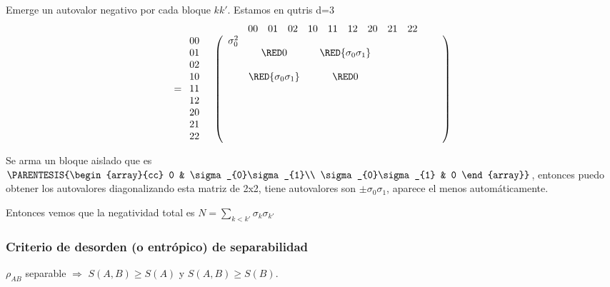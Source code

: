 Emerge un autovalor negativo por cada bloque $kk'$. Estamos en qutris
d=3
\[
\begin{array}{cc}
 & \begin{array}{ccccccccc}
00 & 01 & 02 & 10 & 11 & 12 & 20 & 21 & 22\end{array}\\
=\begin{array}{c}
00\\
01\\
02\\
10\\
11\\
12\\
20\\
21\\
22
\end{array} & \left(\begin{array}{ccccccccc}
\sigma_{0}^{2} &  &  &  & \text{ } & \text{ } & \text{ } & \text{ } & \text{ }\\
 & \RED 0 &  & \RED{\sigma_{0}\sigma_{1}}\\
 &  &  &  & \text{ }\\
 & \RED{\sigma_{0}\sigma_{1}} &  & \RED 0\\
 &  &  &  &  &  & \text{ }\\
 &  &  &  &  &  &  & \text{ }\\
 &  &  &  &  &  &  &  & \text{ }\\
 &  &  &  &  &  &  & \text{ }\\
 &  &  &  &  &  & \text{ }
\end{array}\right)
\end{array}
\]

Se arma un bloque aislado que es $\PARENTESIS{\begin{array}{cc}
0 & \sigma_{0}\sigma_{1}\\
\sigma_{0}\sigma_{1} & 0
\end{array}}$, entonces puedo obtener los autovalores diagonalizando esta matriz
de 2x2, tiene autovalores son $\pm\sigma_{0}\sigma_{1}$, aparece
el menos automáticamente.

Entonces vemos que la negatividad total es $N=\sum_{k<k'}\sigma_{k}\sigma_{k'}$

\subsubsection{Criterio de desorden (o entrópico) de separabilidad}

$\rho_{AB}$ separable $\Rightarrow$ $S(A,B)\geq S(A)$ y $S(A,B)\geq S(B)$.

